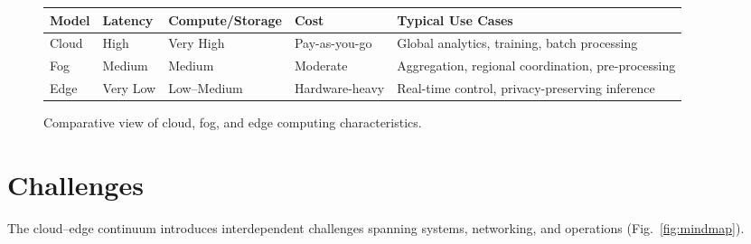 \documentclass[conference]{IEEEtran}
\begin{document}
\begin{figure}[t]
  \centering
  \renewcommand{\arraystretch}{1.2}
  \begin{tabular}{@{}p{1.8cm}p{1.2cm}p{1.6cm}p{1.5cm}p{2.4cm}@{}}
    \toprule
    \textbf{Model} & \textbf{Latency} & \textbf{Compute/Storage} & \textbf{Cost} & \textbf{Typical Use Cases} \\
    \midrule
    Cloud & High & Very High & Pay-as-you-go & Global analytics, training, batch processing \\
    Fog & Medium & Medium & Moderate & Aggregation, regional coordination, pre-processing \\
    Edge & Very Low & Low--Medium & Hardware-heavy & Real-time control, privacy-preserving inference \\
    \bottomrule
  \end{tabular}
  \caption{Comparative view of cloud, fog, and edge computing characteristics.}
  \label{fig:compare}
\end{figure}

\section{Challenges}\label{sec:challenges}
The cloud--edge continuum introduces interdependent challenges spanning systems, networking, and operations (Fig.~\ref{fig:mindmap}).
\end{document}
